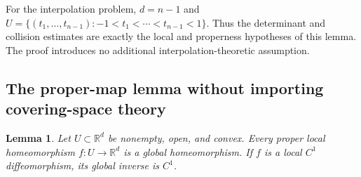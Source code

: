\documentclass[11pt]{article}
\newcommand{\R}{\mathbb R}
\newtheorem{lemma}[theorem]{Lemma}
\theoremstyle{remark}
\numberwithin{equation}{section}
\begin{document}
For the interpolation problem, $d=n-1$ and
$U=\{(t_1,\ldots,t_{n-1}):-1<t_1<\cdots<t_{n-1}<1\}$.
Thus the determinant and collision estimates are exactly the local
and properness hypotheses of this lemma.  The proof introduces no
additional interpolation-theoretic assumption.

\subsection{The proper-map lemma without importing covering-space theory}
\label{polyretry:proper-inverse}

\begin{lemma}
Let $U\subset\R^d$ be nonempty, open, and convex.  Every proper
local homeomorphism $f:U\to\R^d$ is a global homeomorphism.
If $f$ is a local $C^1$ diffeomorphism, its global inverse is $C^1$.
\end{lemma}
\end{document}
